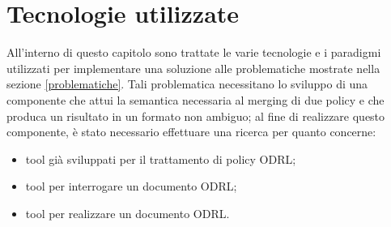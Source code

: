 \documentclass[12pt,a4paper,twoside]{book}
\begin{document}
\chapter{Tecnologie utilizzate}
All'interno di questo capitolo sono trattate le varie tecnologie e i paradigmi utilizzati per implementare una soluzione alle problematiche mostrate nella sezione \ref{problematiche}. Tali problematica necessitano lo sviluppo di una componente che attui la semantica necessaria al merging di due policy e che produca un risultato in un formato non ambiguo; al fine di realizzare questo componente, è stato necessario effettuare una ricerca per quanto concerne:
\begin{itemize}
	\item tool già sviluppati per il trattamento di policy ODRL;
	\item tool per interrogare un documento ODRL;
	\item tool per realizzare un documento ODRL.
\end{itemize}
\end{document}
